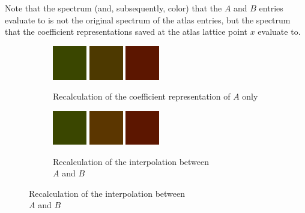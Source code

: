 Note that the spectrum (and, subsequently, color) that the $A$ and $B$ entries evaluate to is not the original spectrum of the atlas entries, but the spectrum that the coefficient representations saved at the atlas lattice point $x$ evaluate to.

 \begin{figure}[t!]
 	\centering
 	\captionsetup[subfigure]{font=footnotesize,labelfont=footnotesize}
 	\captionsetup[subfigure]{justification=centering}
 	\begin{subfigure}[t]{0.30\textwidth}
 		\includegraphics[width=1\linewidth,height=4em]{img/recalculation_color_green.png}
 		\includegraphics[width=1\linewidth,height=4em]{img/recalculation_color_fitGreen.png}
 		\includegraphics[width=1\linewidth,height=4em]{img/recalculation_color_red.png}
 		\caption{Recalculation of the coefficient representation of $A$ only}
 		\label{fig:recalculation_colorGradients_green}
 	\end{subfigure}
 	\begin{subfigure}[t]{0.30\textwidth}
 		\includegraphics[width=1\linewidth,height=4em]{img/recalculation_color_green.png}
 		\includegraphics[width=1\linewidth,height=4em]{img/recalculation_color_interpolated.png}
 		\includegraphics[width=1\linewidth,height=4em]{img/recalculation_color_red.png}
 		\caption{Recalculation of the interpolation between\\ $A$ and $B$}

\end{subfigure}
\end{figure}
